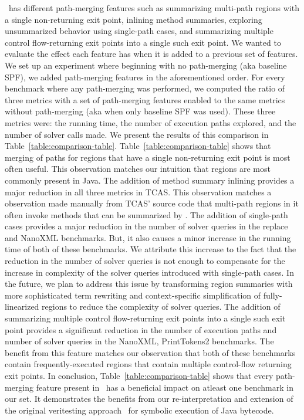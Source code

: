 \tool\ has different path-merging features such as summarizing multi-path regions with a single non-returning exit
point, inlining method summaries, exploring unsummarized behavior using single-path cases, and summarizing multiple
control flow-returning exit points into a single such exit point.
%
We wanted to evaluate the effect each feature has when it is added to a previous set of features.
%
We set up an experiment where beginning with no path-merging (aka baseline SPF), we added path-merging features in the
aforementioned order.
%
For every benchmark where any path-merging was performed, we computed the ratio of three metrics with a set of
path-merging features enabled to the same metrics without path-merging (aka when only baseline SPF was used).
%
These three metrics were: the running time, the number of execution paths explored, and the number of solver calls made.
%
We present the results of this comparison in Table~\ref{table:comparison-table}.
%
Table~\ref{table:comparison-table} shows that merging of paths for regions that have a single non-returning exit point
is most often useful.
%
This observation matches our intuition that regions are most commonly present in Java.
%
The addition of method summary inlining provides a major reduction in all three metrics in TCAS.
%
This observation matches a observation made manually from TCAS' source code that multi-path regions in it often invoke
methods that can be summarized by \tool.
%
The addition of single-path cases provides a major reduction in the number of solver queries in the replace and
NanoXML benchmarks.
%
But, it also causes a minor increase in the running time of both of these benchmarks.
%
We attribute this increase to the fact that the reduction in the number of solver queries is not enough to compensate
for the increase in complexity of the solver queries introduced with single-path cases.
%
In the future, we plan to address this issue by transforming region summaries with more sophisticated term rewriting
and context-specific simplification of fully-linearized regions to reduce the complexity of solver queries.
%
The addition of summarizing multiple control flow-returning exit points into a single such exit point provides a
significant reduction in the number of execution paths and number of solver queries in the NanoXML, PrintTokens2
benchmarks.
%
The benefit from this feature matches our observation that both of these benchmarks contain frequently-executed
regions that contain multiple control-flow returning exit points.
%
In conclusion, Table~\ref{table:comparison-table} shows that every path-merging feature present in \tool\ has a
beneficial impact on atleast one benchmark in our set.
%
It demonstrates the benefits from our re-interpretation and extension of the original veritesting approach~\cite{veritesting}
for symbolic execution of Java bytecode.